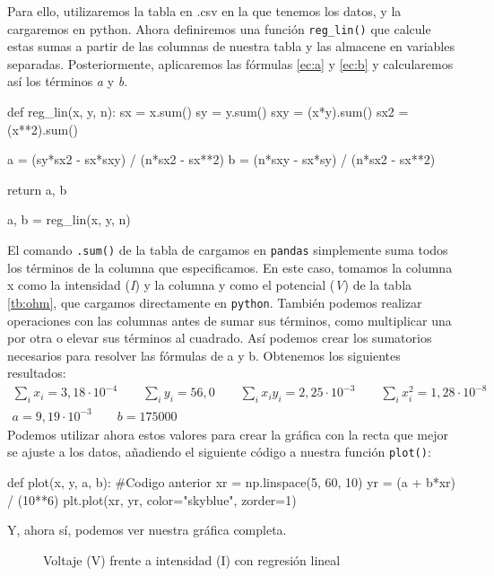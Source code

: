 \documentclass[12pt, a4paper, titlepage]{article}
\newcommand{\code}[1]{\texttt{#1}} %
\begin{document}
  Para ello, utilizaremos la tabla en .csv en la que tenemos los datos, y la cargaremos en python. Ahora definiremos una función \code{reg\_lin()} que calcule estas sumas a partir de las columnas de nuestra tabla y las almacene en variables separadas. Posteriormente, aplicaremos las fórmulas \ref{ec:a} y \ref{ec:b} y calcularemos así los términos \textit{a} y \textit{b}.

  \begin{python}
    def reg_lin(x, y, n):
        sx = x.sum()
        sy = y.sum()
        sxy = (x*y).sum()
        sx2 = (x**2).sum()

        a = (sy*sx2 - sx*sxy) / (n*sx2 - sx**2)
        b = (n*sxy - sx*sy) / (n*sx2 - sx**2)

        return a, b

    a, b = reg_lin(x, y, n)
  \end{python}

  El comando \code{.sum()} de la tabla de cargamos en \code{pandas} simplemente suma todos los términos de la columna que especificamos. En este caso, tomamos la columna x como la intensidad (\textit{I}) y la columna y como el potencial (\textit{V}) de la tabla \ref{tb:ohm}, que cargamos directamente en \code{python}. También podemos realizar operaciones con las columnas antes de sumar sus términos, como multiplicar una por otra o elevar sus términos al cuadrado. Así podemos crear los sumatorios necesarios para resolver las fórmulas de a y b. Obtenemos los siguientes resultados:
  \begin{gather}
    \sum_i x_i = 3,18\cdot10^{-4} \nonumber \qquad \sum_i y_i = 56,0 \nonumber \qquad \sum_i x_iy_i = 2,25\cdot10^{-3} \nonumber \qquad \sum_i x_i^2 = 1,28\cdot10^{-8} \nonumber \\
    a = 9,19\cdot10^{-3} \nonumber \qquad b = 175000 \nonumber
  \end{gather}
  Podemos utilizar ahora estos valores para crear la gráfica con la recta que mejor se ajuste a los datos, añadiendo el siguiente código a nuestra función \code{plot()}:

  \begin{python}
    def plot(x, y, a, b):
      #Codigo anterior
      xr = np.linspace(5, 60, 10)
      yr = (a + b*xr) / (10**6)
      plt.plot(xr, yr, color="skyblue", zorder=1)
  \end{python}

  Y, ahora sí, podemos ver nuestra gráfica completa.

  \begin{figure}[H]
    \hspace{2.5em} 
    \caption{Voltaje (V) frente a intensidad (I) con regresión lineal}
  \end{figure}
\end{document}
